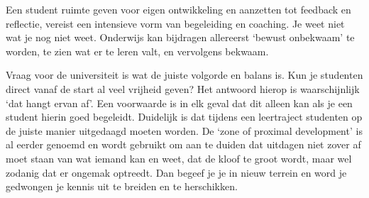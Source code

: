 \documentclass[empirical, authordate, ]{new-jote-article}
\begin{document}
	Een student ruimte geven voor eigen ontwikkeling en aanzetten tot feedback en reflectie, vereist een intensieve vorm van begeleiding en coaching. Je weet niet wat je nog niet weet. Onderwijs kan bijdragen allereerst ‘bewust onbekwaam' te worden, te zien wat er te leren valt, en vervolgens bekwaam.



	Vraag voor de universiteit is wat de juiste volgorde en balans is. Kun je studenten direct vanaf de start al veel vrijheid geven? Het antwoord hierop is waarschijnlijk ‘dat hangt ervan af'. Een voorwaarde is in elk geval dat dit alleen kan als je een student hierin goed begeleidt. Duidelijk is dat tijdens een leertraject studenten op de juiste manier uitgedaagd moeten worden. De ‘zone of proximal development' is al eerder genoemd en wordt gebruikt om aan te duiden dat uitdagen niet zover af moet staan van wat iemand kan en weet, dat de kloof te groot wordt, maar wel zodanig dat er ongemak optreedt. Dan begeef je je in nieuw terrein en word je gedwongen je kennis uit te breiden en te herschikken.
\end{document}
